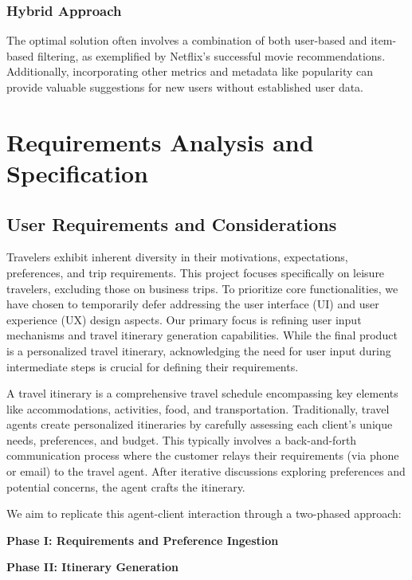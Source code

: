 \documentclass[12pt,a4paper]{report}
\begin{document}
\subsection{Hybrid Approach} The optimal solution often involves a combination of both user-based and item-based filtering, as exemplified by Netflix's successful movie recommendations. Additionally, incorporating other metrics and metadata like popularity can provide valuable suggestions for new users without established user data.


\chapter{Requirements Analysis and Specification}

\section{User Requirements and Considerations}

Travelers exhibit inherent diversity in their motivations, expectations, preferences, and trip requirements. This project focuses specifically on leisure travelers, excluding those on business trips. To prioritize core functionalities, we have chosen to temporarily defer addressing the user interface (UI) and user experience (UX) design aspects. Our primary focus is refining user input mechanisms and travel itinerary generation capabilities. While the final product is a personalized travel itinerary, acknowledging the need for user input during intermediate steps is crucial for defining their requirements.

A travel itinerary is a comprehensive travel schedule encompassing key elements like accommodations, activities, food, and transportation. Traditionally, travel agents create personalized itineraries by carefully assessing each client's unique needs, preferences, and budget. This typically involves a back-and-forth communication process where the customer relays their requirements (via phone or email) to the travel agent. After iterative discussions exploring preferences and potential concerns, the agent crafts the itinerary.

We aim to replicate this agent-client interaction through a two-phased approach:
\begin{description}
\item{\textbf{Phase I: Requirements and Preference Ingestion}}
\item{\textbf{Phase II: Itinerary Generation}}
\end{description}
\end{document}
